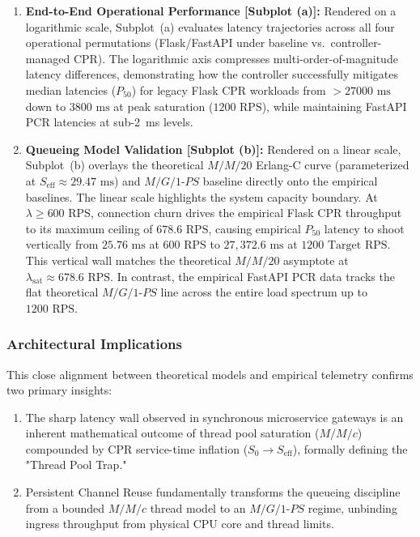 \documentclass{ieeeaccess}
\begin{document}
\begin{enumerate}
	\item \textbf{End-to-End Operational Performance [Subplot (a)]:} Rendered on a logarithmic scale, Subplot~(a) evaluates latency trajectories across all four operational permutations (Flask/FastAPI under baseline vs.\ controller-managed CPR). The logarithmic axis compresses multi-order-of-magnitude latency differences, demonstrating how the controller successfully mitigates median latencies ($P_{50}$) for legacy Flask CPR workloads from $>27000\text{ ms}$ down to $3800\text{ ms}$ at peak saturation ($1200\text{ RPS}$), while maintaining FastAPI PCR latencies at sub-2~ms levels.
	\item \textbf{Queueing Model Validation [Subplot (b)]:} Rendered on a linear scale, Subplot~(b) overlays the theoretical $M/M/20$ Erlang-C curve (parameterized at $S_{\text{eff}} \approx 29.47\text{ ms}$) and $M/G/1\text{-}PS$ baseline directly onto the empirical baselines. The linear scale highlights the system capacity boundary. At $\lambda \ge 600\text{ RPS}$, connection churn drives the empirical Flask CPR throughput to its maximum ceiling of $678.6\text{ RPS}$, causing empirical $P_{50}$ latency to shoot vertically from $25.76\text{ ms}$ at $600\text{ RPS}$ to $27,372.6\text{ ms}$ at $1200\text{ Target RPS}$. This vertical wall matches the theoretical $M/M/20$ asymptote at $\lambda_{\text{sat}} \approx 678.6\text{ RPS}$. In contrast, the empirical FastAPI PCR data tracks the flat theoretical $M/G/1\text{-}PS$ line across the entire load spectrum up to $1200\text{ RPS}$.
\end{enumerate}

\subsubsection{Architectural Implications}
This close alignment between theoretical models and empirical telemetry confirms two primary insights:
\begin{enumerate}
	\item The sharp latency wall observed in synchronous microservice gateways is an inherent mathematical outcome of thread pool saturation ($M/M/c$) compounded by CPR service-time inflation ($S_0 \to S_{\text{eff}}$), formally defining the "Thread Pool Trap."
	\item Persistent Channel Reuse fundamentally transforms the queueing discipline from a bounded $M/M/c$ thread model to an $M/G/1\text{-}PS$ regime, unbinding ingress throughput from physical CPU core and thread limits.
\end{enumerate}
\end{document}
